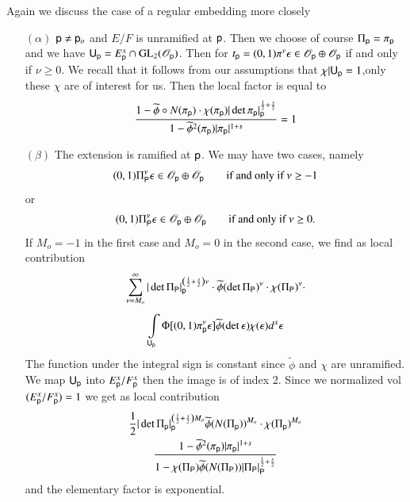 Again we discuss the case of a regular embedding more closely 
\begin{itemize}
\item[$(\alpha)$] $\mathsf{p}\neq \mathsf{p}_{o}$ and $E/F$ is unramified at $\mathsf{p}$. Then we choose of course $\Pi_{\mathsf{p}}=\pi_{\mathsf{p}}$ and we have $\mathsf{U}_{\mathsf{p}}=E^{x}_{\mathsf{p}}\cap \mathrm{GL}_{2}(\mathscr{O}_{\mathsf{p}})$. Then for $t_{\mathsf{p}}=(0,1)\pi^{\nu}\epsilon \in \mathscr{O}_{\mathsf{p}}\oplus \mathscr{O}_{\mathsf{p}}$ if and only if $\nu\geq 0$. We recall that it follows from our assumptions that $\chi|\mathsf{U}_{\mathsf{p}}=1$,\pageoriginale only these $\chi$ are of interest for us. Then the local factor is equal to
$$
\frac{1-\widetilde{\phi}\circ N(\pi_{\mathsf{p}})\cdot \chi(\pi_{\mathsf{p}})|\det \pi_{\mathsf{p}}|^{\frac{1}{2}+\frac{s}{2}}_{\mathsf{p}}}{1-\widetilde{\phi}^{2}(\pi_{\mathsf{p}})|\pi_{\mathsf{p}}|^{1+s}}=1
$$

\item[$(\beta)$] The extension is ramified at $\mathsf{p}$. We may have two cases, namely
$$
(0,1)\Pi^{\nu}_{\mathsf{P}}\epsilon \in \mathscr{O}_{\mathsf{p}}\oplus \mathscr{O}_{\mathsf{p}}\qquad \text{if and only if~ } \nu\geq -1
$$
or
$$
(0,1)\Pi^{\nu}_{\mathsf{P}}\epsilon \in \mathscr{O}_{\mathsf{p}}\oplus \mathscr{O}_{\mathsf{p}}\qquad \text{if and only if~ }\nu\geq 0.
$$
If $M_{o}=-1$ in the first case and $M_{o}=0$ in the second case, we find as local contribution
\begin{gather*}
\sum\limits^{\infty}_{\nu=M_{o}}|\det \Pi_{\mathsf{P}}|^{\left(\frac{1}{2}+\frac{s}{2}\right)\nu}_{\mathsf{p}}\cdot \widetilde{\phi}(\det \Pi_{\mathsf{P}})^{\nu}\cdot \chi(\Pi_{\mathsf{P}})^{\nu}\cdot \\[4pt]
\int\limits_{\mathsf{U}_{\mathsf{p}}}\Phi[(0,1)\pi^{\nu}_{\mathsf{p}}\epsilon]\widetilde{\phi}(\det \epsilon)\chi(\epsilon)d^{x}\epsilon
\end{gather*}
The function under the integral sign is constant since $\widetilde{\phi}$ and $\chi$ are unramified. We map $\mathsf{U}_{\mathsf{p}}$ into $E^{x}_{\mathsf{p}}/F^{x}_{\mathsf{p}}$ then the image is of index 2. Since we normalized vol $(E^{x}_{\mathsf{p}}/F^{x}_{\mathsf{p}})=1$ we get as local contribution
\begin{multline*}
\frac{1}{2}|\det \Pi_{\mathsf{p}}|^{\left(\frac{1}{2}+\frac{s}{2}\right)M_{o}}_{\mathsf{p}}\widetilde{\phi}(N(\Pi_{\mathsf{p}}))^{M_{o}}\cdot \chi(\Pi_{\mathsf{p}})^{M_{o}}\\
\frac{1-\widetilde{\phi}^{2}(\pi_{\mathsf{p}})|\pi_{\mathsf{p}}|^{1+s}}{1-\chi(\Pi_{\mathsf{P}})\widetilde{\phi}(N(\Pi_{\mathsf{P}}))|\Pi_{\mathsf{P}}|^{\frac{1}{2}+\frac{s}{2}}_{\mathsf{P}}}
\end{multline*}
and the elementary factor is exponential.


\end{itemize}
